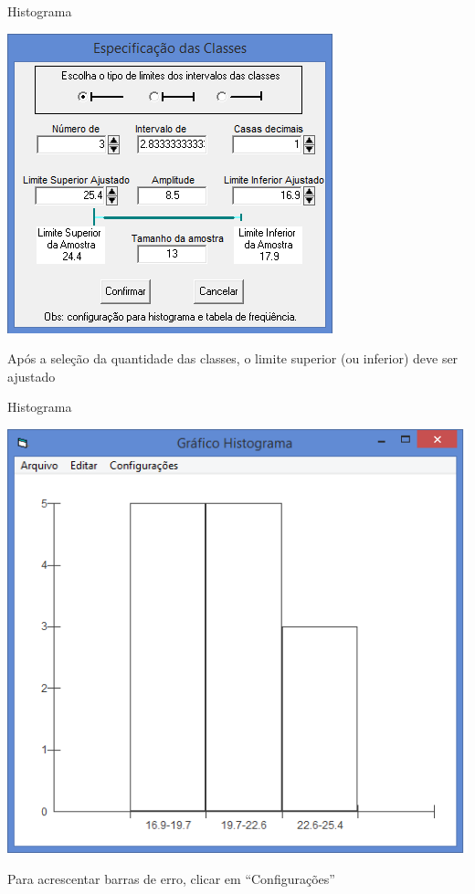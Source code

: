 \documentclass{beamer}
\begin{document}

\begin{frame}{Histograma}
  \begin{center}
    \includegraphics[height=0.7\textheight]{Pratica_Desc/histograma3}
  \end{center}

  Após a seleção da quantidade das classes, o limite superior (ou
  inferior) deve ser ajustado
\end{frame}

\begin{frame}{Histograma}
  \begin{center}
    \includegraphics[height=0.7\textheight]{Pratica_Desc/histograma4}
  \end{center}

  Para acrescentar barras de erro, clicar em ``Configurações''
\end{frame}
\end{document}

